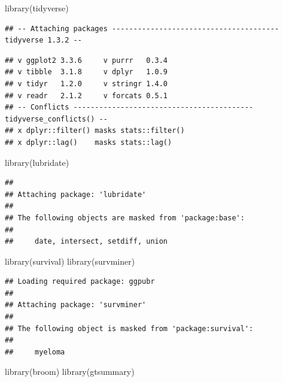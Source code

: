 \documentclass[
  10pt,
]{krantz}
\newenvironment{Shaded}{\begin{snugshade}}{\end{snugshade}}
\newcommand{\FunctionTok}[1]{\textcolor[rgb]{0.00,0.00,0.00}{#1}}
\newcommand{\NormalTok}[1]{#1}
\begin{document}
\begin{Shaded}
\begin{Highlighting}[]
\FunctionTok{library}\NormalTok{(tidyverse)}
\end{Highlighting}
\end{Shaded}

\begin{verbatim}
## -- Attaching packages --------------------------------------- tidyverse 1.3.2 --
\end{verbatim}

\begin{verbatim}
## v ggplot2 3.3.6     v purrr   0.3.4
## v tibble  3.1.8     v dplyr   1.0.9
## v tidyr   1.2.0     v stringr 1.4.0
## v readr   2.1.2     v forcats 0.5.1
## -- Conflicts ------------------------------------------ tidyverse_conflicts() --
## x dplyr::filter() masks stats::filter()
## x dplyr::lag()    masks stats::lag()
\end{verbatim}

\begin{Shaded}
\begin{Highlighting}[]
\FunctionTok{library}\NormalTok{(lubridate)}
\end{Highlighting}
\end{Shaded}

\begin{verbatim}
## 
## Attaching package: 'lubridate'
## 
## The following objects are masked from 'package:base':
## 
##     date, intersect, setdiff, union
\end{verbatim}

\begin{Shaded}
\begin{Highlighting}[]
\FunctionTok{library}\NormalTok{(survival)}
\FunctionTok{library}\NormalTok{(survminer)}
\end{Highlighting}
\end{Shaded}

\begin{verbatim}
## Loading required package: ggpubr
## 
## Attaching package: 'survminer'
## 
## The following object is masked from 'package:survival':
## 
##     myeloma
\end{verbatim}

\begin{Shaded}
\begin{Highlighting}[]
\FunctionTok{library}\NormalTok{(broom)}
\FunctionTok{library}\NormalTok{(gtsummary)}
\end{Highlighting}
\end{Shaded}
\end{document}
